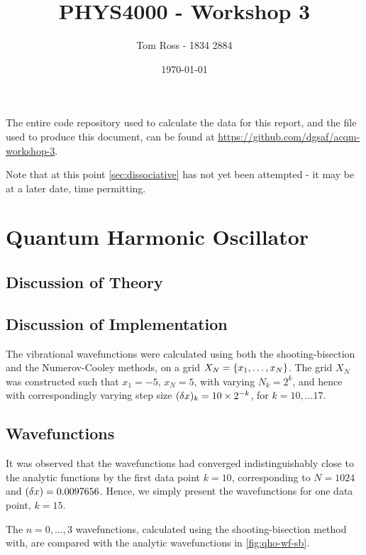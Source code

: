 \documentclass{article}
\title{PHYS4000 - Workshop 3}
\author{Tom Ross - 1834 2884}
\date{\today}
\begin{document}
\tableofcontents

\listoffigures

\listoftables

\clearpage

The entire code repository used to calculate the data for this report, and the
 file used to produce this  document, can be found at
\url{https://github.com/dgsaf/acqm-workshop-3}.

Note that at this point \autoref{sec:dissociative} has not yet been attempted -
it may be at a later date, time permitting.

\section{Quantum Harmonic Oscillator}
\label{sec:qho}

\subsection*{Discussion of Theory}
\label{sec:qho-theory}

\subsection*{Discussion of Implementation}
\label{sec:qho-implementation}

The vibrational wavefunctions were calculated using both the shooting-bisection
and the Numerov-Cooley methods, on a grid
$X_{N} = \lbrace x_{1}, \dotsc, x_{N}\rbrace$.
The grid $X_{N}$ was constructed such that $x_{1} = -5$, $x_{N} = 5$, with
varying $N_{k} = 2^{k}$, and hence with correspondingly varying step size
$(\delta x)_{k} = 10 \times 2^{-k}$, for $k = 10, \dotsc 17$.

\subsection*{Wavefunctions}
\label{sec:qho-wavefunctions}

It was observed that the wavefunctions had converged indistinguishably close to
the analytic functions by the first data point $k = 10$, corresponding to
$N = 1024$ and $(\delta x) = 0.0097656$.
Hence, we simply present the wavefunctions for one data point, $k = 15$.

The $n = 0, \dotsc, 3$ wavefunctions, calculated using the shooting-bisection
method with, are compared with the analytic wavefunctions in
\autoref{fig:qho-wf-sb}.
\end{document}
